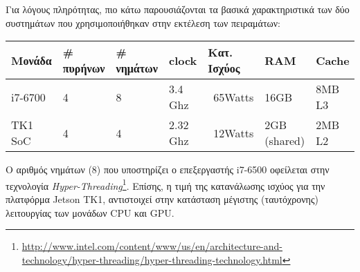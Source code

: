 

Για λόγους πληρότητας, πιο κάτω παρουσιάζονται τα βασικά χαρακτηριστικά
των δύο συστημάτων που χρησιμοποιήθηκαν στην εκτέλεση των πειραμάτων:
\begin{center}
\small
\begin{tabular}{ | l | l | l | l | l | l | l | }
  \hline
  \rowcolor{Gray}
  Μονάδα & \# πυρήνων & \# νημάτων & clock & Κατ. Ισχύος & RAM & Cache \\
  \hline
  i7-6700 & 4 & 8 & 3.4 Ghz & ~65Watts & 16GB & 8MΒ L3 \\
  \hline
  TK1 SoC & 4 & 4 & 2.32 Ghz & ~12Watts & 2GB (shared) & 2MB L2 \\
  \hline
\end{tabular}
\end{center}

Ο αριθμός νημάτων (8) που υποστηρίζει ο επεξεργαστής i7-6500 οφείλεται στην
τεχνολογία \emph{Hyper-Threading}\footnote{\url{http://www.intel.com/content/www/us/en/architecture-and-technology/hyper-threading/hyper-threading-technology.html}}.
Επίσης, η τιμή της κατανάλωσης ισχύος για την
πλατφόρμα Jetson TK1, αντιστοιχεί στην κατάσταση μέγιστης (ταυτόχρονης) λειτουργίας των μονάδων
CPU και GPU.




\newpage

